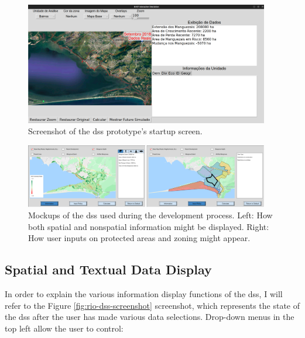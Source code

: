 \begin{figure}[!htb] 
\centering
\includegraphics[width=0.95\textwidth]{Figures/chap4/rio-dss-startup-screenshot.png}
\caption[Screenshot of Startup Screen of the Rio de Janeiro DSS]{Screenshot of the \ac{dss} prototype's startup screen.}
\label{fig:rio-dss-startup-screenshot}
\end{figure}

\begin{figure}[!htb] 
\centering
\includegraphics[width=0.95\textwidth]{Figures/chap4/display_and_input.png}
\caption[Rio DSS Mockups]{Mockups of the \ac{dss} used during the development process. Left: How both spatial and nonspatial information might be displayed. Right: How user inputs on protected areas and zoning might appear.}
\label{fig:mockup}
\end{figure}

\subsection{Spatial and Textual Data Display}

In order to explain the various information display functions of the \ac{dss}, I will refer to the Figure \ref{fig:rio-dss-screenshot} screenshot, which represents the state of the \ac{dss} after the user has made various data selections. Drop-down menus in the top left allow the user to control:

